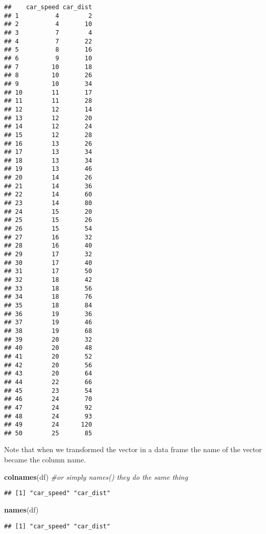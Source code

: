 \documentclass[
]{article}
\newenvironment{Shaded}{\begin{snugshade}}{\end{snugshade}}
\newcommand{\CommentTok}[1]{\textcolor[rgb]{0.56,0.35,0.01}{\textit{#1}}}
\newcommand{\FunctionTok}[1]{\textcolor[rgb]{0.13,0.29,0.53}{\textbf{#1}}}
\newcommand{\NormalTok}[1]{#1}
\begin{document}
\begin{verbatim}
##    car_speed car_dist
## 1          4        2
## 2          4       10
## 3          7        4
## 4          7       22
## 5          8       16
## 6          9       10
## 7         10       18
## 8         10       26
## 9         10       34
## 10        11       17
## 11        11       28
## 12        12       14
## 13        12       20
## 14        12       24
## 15        12       28
## 16        13       26
## 17        13       34
## 18        13       34
## 19        13       46
## 20        14       26
## 21        14       36
## 22        14       60
## 23        14       80
## 24        15       20
## 25        15       26
## 26        15       54
## 27        16       32
## 28        16       40
## 29        17       32
## 30        17       40
## 31        17       50
## 32        18       42
## 33        18       56
## 34        18       76
## 35        18       84
## 36        19       36
## 37        19       46
## 38        19       68
## 39        20       32
## 40        20       48
## 41        20       52
## 42        20       56
## 43        20       64
## 44        22       66
## 45        23       54
## 46        24       70
## 47        24       92
## 48        24       93
## 49        24      120
## 50        25       85
\end{verbatim}

Note that when we transformed the vector in a data frame the name of the
vector became the column name.

\begin{Shaded}
\begin{Highlighting}[]
\FunctionTok{colnames}\NormalTok{(df)  }\CommentTok{\#or simply names() they do the same thing}
\end{Highlighting}
\end{Shaded}

\begin{verbatim}
## [1] "car_speed" "car_dist"
\end{verbatim}

\begin{Shaded}
\begin{Highlighting}[]
\FunctionTok{names}\NormalTok{(df)}
\end{Highlighting}
\end{Shaded}

\begin{verbatim}
## [1] "car_speed" "car_dist"
\end{verbatim}
\end{document}

